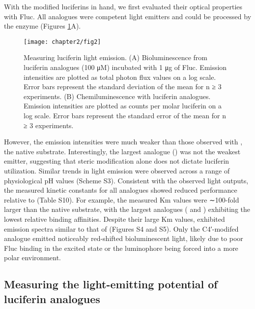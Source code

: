 With the modified luciferins in hand, we first
evaluated their optical properties with Fluc. All analogues were
competent light emitters and could be processed by the enzyme
(Figures \ref{fig:chemilum_biolum}A).
\begin{figure}[htbp]
\texttt{[image: chapter2/fig2]}
\centering
\caption[Measuring luciferin light emission]{Measuring luciferin light emission. (A) Bioluminescence
from luciferin analogues (100 μM) incubated with 1 μg of Fluc.
Emission intensities are plotted as total photon flux values on a log
scale. Error bars represent the standard deviation of the mean for n ≥ 3
experiments. (B) Chemiluminescence with luciferin analogues.
Emission intensities are plotted as counts per molar luciferin on a
log scale. Error bars represent the standard error of the mean for n ≥ 3
experiments.}
  \label{fig:chemilum_biolum}
\end{figure}
However, the emission intensities were much weaker than those observed with \dluciferin{}, the native
substrate. Interestingly, the largest analogue () was not the
weakest emitter, suggesting that steric modification alone does
not dictate luciferin utilization. Similar trends in light emission
were observed across a range of physiological pH values
(Scheme S3). Consistent with the observed light outputs, the
measured kinetic constants for all analogues showed reduced performance relative to \dluciferin{} (Table S10). For example,
the measured Km values were ∼100-fold larger than the native
substrate, with the largest analogues ( and ) exhibiting the
lowest relative binding affinities. Despite their large Km values,
 exhibited emission spectra similar to that of \dluciferin{}
(Figures S4 and S5). Only the C4′-modifed analogue 
emitted noticeably red-shifted bioluminescent light, likely due
to poor Fluc binding in the excited state\cite{RN86} or the luminophore
being forced into a more polar environment.\cite{Hirano:2012fu, Viviani:2014cua}

\subsection*{Measuring the light-emitting potential of luciferin analogues}

